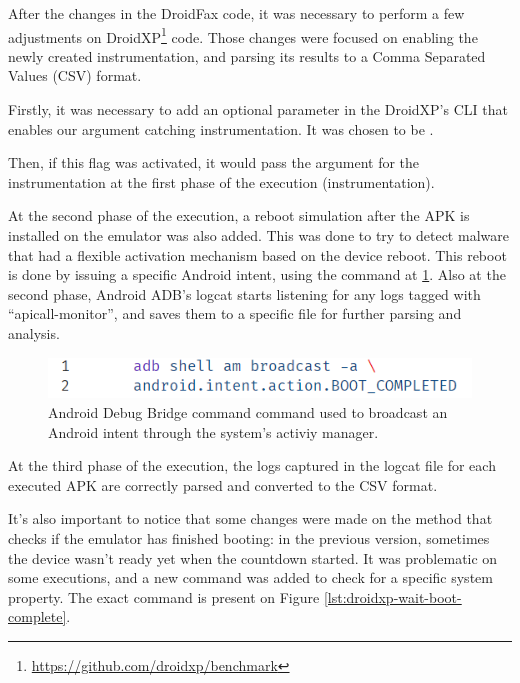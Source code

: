 After the changes in the DroidFax code, it was necessary to perform a few adjustments on DroidXP\footnote{\url{https://github.com/droidxp/benchmark}} code. Those changes were focused on enabling the newly created instrumentation, and parsing its results to a Comma Separated Values (CSV) format.

Firstly, it was necessary to add an optional parameter in the DroidXP's CLI that enables our argument catching instrumentation. It was chosen to be .

Then, if this flag was activated, it would pass the  argument for the instrumentation at the first phase of the execution (instrumentation). 

At the second phase of the execution, a reboot simulation after the APK is installed on the emulator was also added. This was done to try to detect malware that had a flexible activation mechanism based on the device reboot. This reboot is done by issuing a specific Android intent, using the command at \ref{lst:droidxp-intent-reboot}. Also at the second phase, Android ADB's logcat\cite{noauthor_logcat_2023} starts listening for any logs tagged with ``apicall-monitor'', and saves them to a specific file for further parsing and analysis.

\begin{figure}
    \centering
    \includegraphics{img/adb-boot.png}
    \caption{Android Debug Bridge command command used to broadcast an Android intent through the system's activiy manager.}
    \label{lst:droidxp-intent-reboot}
\end{figure}


At the third phase of the execution, the logs captured in the logcat file for each executed APK are correctly parsed and converted to the CSV format.

It's also important to notice that some changes were made on the method that checks if the emulator has finished booting: in the previous version, sometimes the device wasn't ready yet when the countdown started. It was problematic on some executions, and a new command was added to check for a specific system property. The exact command is present on Figure \ref{lst:droidxp-wait-boot-complete}.

